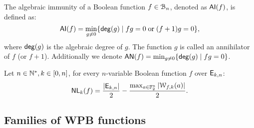 \documentclass[11pt]{llncs}
\begin{document}
\begin{definition} \label{def:ai}
	The algebraic immunity of a Boolean function $f\in \mathcal{B}_{n}$, denoted as $\mathsf{AI}(f)$, is defined as:
	\[ \mathsf{AI}(f) = \min_{g \neq 0}\{ \mathsf{deg}(g) \; | \; fg = 0 \; \text{or} \; (f + 1)g = 0 \}{,} \]
	where $\mathsf{deg}(g)$ is the algebraic degree of $g$.
	The function $g$ is called an annihilator of $f$ (or $f + 1$). 
	Additionally we denote $\mathsf{AN}(f) = \min_{g \neq 0}\{ \mathsf{deg}(g) \; | \; fg = 0\}$.
\end{definition}

\begin{Prop}\label{prop:nlk}
	Let $n\in \mathbb{N}^*, k\in [0,n]$, for every $n$-variable Boolean function $f$ over $\mathsf{E}_{k,n}$:
	\[ \mathsf{NL}_{k}(f)=\frac{|\mathsf{E}_{k,n}|}{2} -\frac{\max_{a\in \mathbb{F}_2^n} |\mathcal{W}_{f,k}(a)|}{2}  .\]
\end{Prop}

\subsection{Families of WPB functions}
\end{document}

